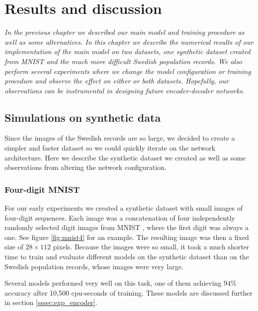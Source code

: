 \chapter{Results and discussion}

\textit{
In the previous chapter we described our main model and training procedure as well as some alternatives.
In this chapter we describe the numerical results of our implementation of the main model on two datasets, one synthetic dataset created from MNIST and the much more difficult Swedish population records. We also perform several experiments where we change the model configuration or training procedure and observe the effect on either or both datasets.
Hopefully, our observations can be instrumental in
designing future encoder-decoder networks.
}

\section{Simulations on synthetic data} \label{sec:simulations}

Since the images of the Swedish records are so large, we decided to create a simpler and faster dataset so we could quickly iterate on the network architecture. Here we describe the synthetic dataset we created as well as some observations from altering the network configuration.

\subsection{Four-digit MNIST}



For our early experiments we created a synthetic dataset with small images of four-digit sequences.
Each image was a concatenation of four independently randomly selected digit images from MNIST \cite{MNIST_orig}, where the first digit was always a one. See figure \ref{fig:mnist4} for an example. The resulting image was then a fixed size of $28 \times 112$ pixels.
Because the images were so small, it took a much shorter time to train and evaluate different models on the synthetic dataset than on the Swedish population records, whose images were very large.

Several models performed very well on this task, one of them achieving $94\%$ accuracy after 10,500 cpu-seconds of training. These models are discussed further in section \ref{sssec:exp_encoder}.

